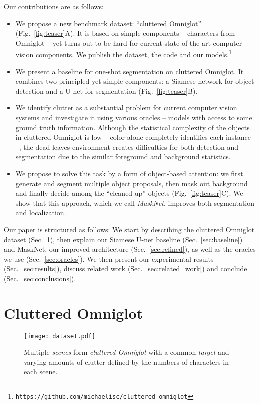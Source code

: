 \documentclass{article}
\begin{document}
Our contributions are as follows:\vspace{-8pt}
\begin{itemize}
    \item We propose a new benchmark dataset: ``cluttered Omniglot'' (Fig.~\ref{fig:teaser}A). It is based on simple components -- characters from Omniglot \cite{Lake2015} -- yet turns out to be hard for current state-of-the-art computer vision components. We publish the dataset, the code and our models.\footnote{\scriptsize\texttt{https://github.com/michaelisc/cluttered-omniglot}}
    \item We present a baseline for one-shot segmentation on cluttered Omniglot. It combines two principled yet simple components: a Siamese network for object detection and a U-net for segmentation (Fig.~\ref{fig:teaser}B).
    \item We identify clutter as a substantial problem for current computer vision systems and investigate it using various oracles -- models with access to some ground truth information. Although the statistical complexity of the objects in cluttered Omniglot is low -- color alone completely identifies each instance --, the dead leaves environment creates difficulties for both detection and segmentation due to the similar foreground and background statistics.
    \item We propose to solve this task by a form of object-based attention: we first generate and segment multiple object proposals, then mask out background and finally decide among the ``cleaned-up'' objects (Fig.~\ref{fig:teaser}C). We show that this approach, which we call \textit{MaskNet}, improves both segmentation and localization.
\end{itemize}

Our paper is structured as follows: We start by describing the cluttered Omniglot dataset (Sec.~\ref{sec:dataset}), then explain our Siamese U-net baseline (Sec.~\ref{sec:baseline}) and MaskNet, our improved architecture (Sec.~\ref{sec:refined}), as well as the oracles we use (Sec.~\ref{sec:oracles}). We then present our experimental results (Sec.~\ref{sec:results}), discuss related work (Sec.~\ref{sec:related_work}) and conclude (Sec.~\ref{sec:conclusions}).


\section{Cluttered Omniglot}
\label{sec:dataset}


\begin{figure*}[ht]
\vskip 0.1in
\begin{center}
\centerline{\texttt{[image: dataset.pdf]}}
\caption{Multiple \textit{scenes} form \textit{cluttered Omniglot} with a common \textit{target} and varying amounts of clutter defined by the numbers of characters in each scene.}
\label{fig:dataset}
\end{center}
\vskip -0.2in
\end{figure*}
\end{document}
